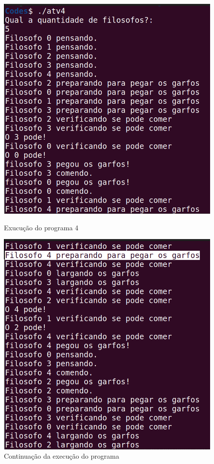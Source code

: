 \documentclass{article}
\begin{document}
\begin{figure}[ht]
    \centering
    \begin{minipage}{0.45\textwidth} %
        \centering
        \includegraphics[width=\textwidth]{./Images/atv4_result.png} %
        \caption{Exucução do programa 4}
        \label{fig:atv4_result}
    \end{minipage} \hfill %
    \begin{minipage}{0.45\textwidth} %
        \centering
        \includegraphics[width=\textwidth]{./Images/atv4_result2.png} %
        \caption{Continuação da execução do programa}
        \label{fig:atv4_result2}
    \end{minipage}
\end{figure}
\end{document}
